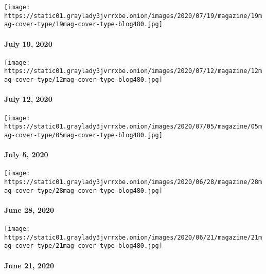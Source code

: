 \texttt{[image: https://static01.graylady3jvrrxbe.onion/images/2020/07/19/magazine/19mag-cover-type/19mag-cover-type-blog480.jpg]}

\hypertarget{july-19-2020}{%
\paragraph{July 19, 2020}\label{july-19-2020}}

\href{https://www.nytimes3xbfgragh.onion/issue/magazine/2020/07/10/the-71220-issue}{}

\texttt{[image: https://static01.graylady3jvrrxbe.onion/images/2020/07/12/magazine/12mag-cover-type/12mag-cover-type-blog480.jpg]}

\hypertarget{july-12-2020}{%
\paragraph{July 12, 2020}\label{july-12-2020}}

\href{https://www.nytimes3xbfgragh.onion/issue/magazine/2020/07/02/the-7520-issue}{}

\texttt{[image: https://static01.graylady3jvrrxbe.onion/images/2020/07/05/magazine/05mag-cover-type/05mag-cover-type-blog480.jpg]}

\hypertarget{july-5-2020}{%
\paragraph{July 5, 2020}\label{july-5-2020}}

\href{https://www.nytimes3xbfgragh.onion/issue/magazine/2020/06/25/the-62820-issue}{}

\texttt{[image: https://static01.graylady3jvrrxbe.onion/images/2020/06/28/magazine/28mag-cover-type/28mag-cover-type-blog480.jpg]}

\hypertarget{june-28-2020}{%
\paragraph{June 28, 2020}\label{june-28-2020}}

\href{https://www.nytimes3xbfgragh.onion/issue/magazine/2020/06/19/the-62120-issue}{}

\texttt{[image: https://static01.graylady3jvrrxbe.onion/images/2020/06/21/magazine/21mag-cover-type/21mag-cover-type-blog480.jpg]}

\hypertarget{june-21-2020}{%
\paragraph{June 21, 2020}\label{june-21-2020}}

